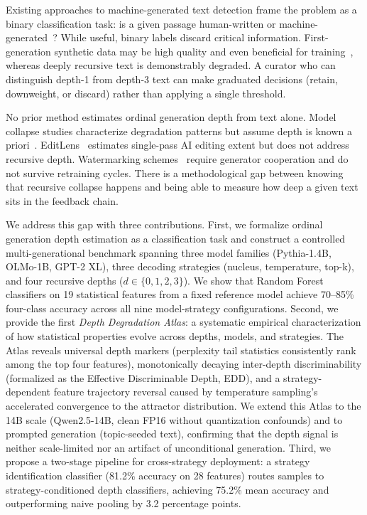 \documentclass[11pt,a4paper]{article}
\newcommand{\edd}{\textsc{EDD}}
\begin{document}
Existing approaches to machine-generated text detection frame the problem as a binary classification task: is a given passage human-written or machine-generated~\citep{mitchell2023detectgpt,hans2024binoculars,bao2024fastdetectgpt}? While useful, binary labels discard critical information. First-generation synthetic data may be high quality and even beneficial for training~\citep{gunasekar2023textbooks}, whereas deeply recursive text is demonstrably degraded. A curator who can distinguish depth-1 from depth-3 text can make graduated decisions (retain, downweight, or discard) rather than applying a single threshold.

No prior method estimates ordinal generation depth from text alone. Model collapse studies characterize degradation patterns but assume depth is known a priori~\citep{drayson2025investigating,shumailov2024ai}. EditLens~\citep{liang2024monitoring} estimates single-pass AI editing extent but does not address recursive depth. Watermarking schemes~\citep{kirchenbauer2023watermark} require generator cooperation and do not survive retraining cycles. There is a methodological gap between knowing that recursive collapse happens and being able to measure how deep a given text sits in the feedback chain.

We address this gap with three contributions. First, we formalize ordinal generation depth estimation as a classification task and construct a controlled multi-generational benchmark spanning three model families (Pythia-1.4B, OLMo-1B, GPT-2 XL), three decoding strategies (nucleus, temperature, top-k), and four recursive depths ($d \in \{0,1,2,3\}$). We show that Random Forest classifiers on 19 statistical features from a fixed reference model achieve 70--85\% four-class accuracy across all nine model-strategy configurations. Second, we provide the first \emph{Depth Degradation Atlas}: a systematic empirical characterization of how statistical properties evolve across depths, models, and strategies. The Atlas reveals universal depth markers (perplexity tail statistics consistently rank among the top four features), monotonically decaying inter-depth discriminability (formalized as the Effective Discriminable Depth, \edd), and a strategy-dependent feature trajectory reversal caused by temperature sampling's accelerated convergence to the attractor distribution. We extend this Atlas to the 14B scale (Qwen2.5-14B, clean FP16 without quantization confounds) and to prompted generation (topic-seeded text), confirming that the depth signal is neither scale-limited nor an artifact of unconditional generation. Third, we propose a two-stage pipeline for cross-strategy deployment: a strategy identification classifier (81.2\% accuracy on 28 features) routes samples to strategy-conditioned depth classifiers, achieving 75.2\% mean accuracy and outperforming naive pooling by 3.2 percentage points.
\end{document}
